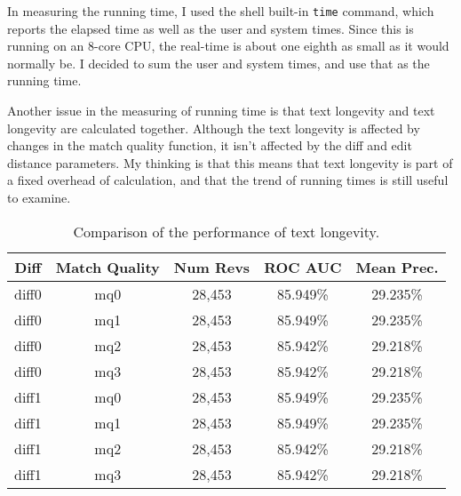 In measuring the running time, I used the shell built-in
\texttt{time} command, which reports the elapsed time as well
as the user and system times.
Since this is running on an 8-core CPU, the real-time is about
one eighth as small as it would normally be.
I decided to sum the user and system times, and use that as
the running time.

Another issue in the measuring of running time is that
text longevity and text longevity are calculated together.
Although the text longevity is affected by changes in the
match quality function, it isn't affected by the diff and
edit distance parameters.
My thinking is that this means that text longevity is part
of a fixed overhead of calculation, and that the trend
of running times is still useful to examine.

\begin{table}[tbph]
\begin{center}
\begin{tabular}{|c|c||c|c|c|}
\hline
Diff & Match Quality & Num Revs & ROC AUC & Mean Prec. \\
\hline
\hline
diff0 & mq0 & 28,453 & 85.949\% & 29.235\% \\
diff0 & mq1 & 28,453 & 85.949\% & 29.235\% \\
diff0 & mq2 & 28,453 & 85.942\% & 29.218\% \\
diff0 & mq3 & 28,453 & 85.942\% & 29.218\% \\
diff1 & mq0 & 28,453 & 85.949\% & 29.235\% \\
diff1 & mq1 & 28,453 & 85.949\% & 29.235\% \\
diff1 & mq2 & 28,453 & 85.942\% & 29.218\% \\
diff1 & mq3 & 28,453 & 85.942\% & 29.218\% \\
\hline
\end{tabular}
\end{center}
\caption{Comparison of the performance of text longevity.
}
\end{table}



